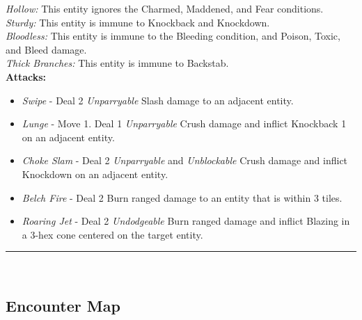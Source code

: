 \emph{Hollow:} This entity ignores the Charmed, Maddened, and Fear conditions.\\

\emph{Sturdy:} This entity is immune to Knockback and Knockdown.\\

\emph{Bloodless:} This entity is immune to the Bleeding condition, and Poison, Toxic, and Bleed damage.\\

\emph{Thick Branches:} This entity is immune to Backstab.\\

\textbf{Attacks:}
\begin{itemize}
\item \emph{Swipe} -  Deal 2 \emph{Unparryable} Slash damage to an adjacent entity.
\item \emph{Lunge} - Move 1. Deal 1 \emph{Unparryable} Crush damage and inflict Knockback 1 on an adjacent entity.
\item \emph{Choke Slam} - Deal 2 \emph{Unparryable} and \emph{Unblockable} Crush damage and inflict Knockdown on an adjacent entity.
\item \emph{Belch Fire} - Deal 2 Burn ranged damage to an entity that is within 3 tiles.
\item \emph{Roaring Jet} - Deal 2 \emph{Undodgeable} Burn ranged damage and inflict Blazing in a 3-hex cone centered on the target entity.
\end{itemize}
\hrule
\ \\

\pagebreak

\subsection*{Encounter Map}
\begin{center}
\end{center}

